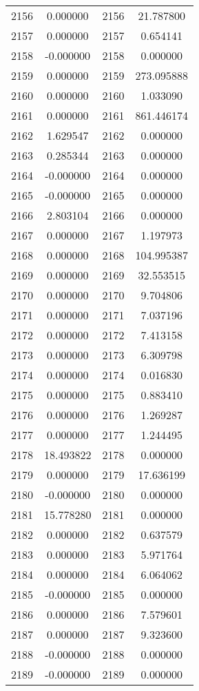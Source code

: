 \documentclass[12pt]{article}
\begin{document}
\begin{longtable}{@{}cccc@{}}
2156 & 0.000000 & 2156 & 21.787800 \\
2157 & 0.000000 & 2157 & 0.654141 \\
2158 & -0.000000 & 2158 & 0.000000 \\
2159 & 0.000000 & 2159 & 273.095888 \\
2160 & 0.000000 & 2160 & 1.033090 \\
2161 & 0.000000 & 2161 & 861.446174 \\
2162 & 1.629547 & 2162 & 0.000000 \\
2163 & 0.285344 & 2163 & 0.000000 \\
2164 & -0.000000 & 2164 & 0.000000 \\
2165 & -0.000000 & 2165 & 0.000000 \\
2166 & 2.803104 & 2166 & 0.000000 \\
2167 & 0.000000 & 2167 & 1.197973 \\
2168 & 0.000000 & 2168 & 104.995387 \\
2169 & 0.000000 & 2169 & 32.553515 \\
2170 & 0.000000 & 2170 & 9.704806 \\
2171 & 0.000000 & 2171 & 7.037196 \\
2172 & 0.000000 & 2172 & 7.413158 \\
2173 & 0.000000 & 2173 & 6.309798 \\
2174 & 0.000000 & 2174 & 0.016830 \\
2175 & 0.000000 & 2175 & 0.883410 \\
2176 & 0.000000 & 2176 & 1.269287 \\
2177 & 0.000000 & 2177 & 1.244495 \\
2178 & 18.493822 & 2178 & 0.000000 \\
2179 & 0.000000 & 2179 & 17.636199 \\
2180 & -0.000000 & 2180 & 0.000000 \\
2181 & 15.778280 & 2181 & 0.000000 \\
2182 & 0.000000 & 2182 & 0.637579 \\
2183 & 0.000000 & 2183 & 5.971764 \\
2184 & 0.000000 & 2184 & 6.064062 \\
2185 & -0.000000 & 2185 & 0.000000 \\
2186 & 0.000000 & 2186 & 7.579601 \\
2187 & 0.000000 & 2187 & 9.323600 \\
2188 & -0.000000 & 2188 & 0.000000 \\
2189 & -0.000000 & 2189 & 0.000000 \\

\end{longtable}
\end{document}
